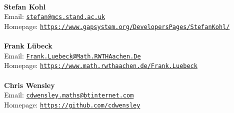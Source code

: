 \documentclass[a4paper,11pt]{report}
\begin{document}
\begin{titlepage}
{\mbox{}\\
\small \noindent \textbf{ Stefan Kohl\\
   }  Email: \href{mailto://stefan@mcs.st-and.ac.uk} {\texttt{stefan@mcs.st\texttt{}and.ac.uk}}\\
  Homepage: \href{https://www.gap-system.org/DevelopersPages/StefanKohl/} {\texttt{https://www.gap\texttt{}system.org/DevelopersPages/StefanKohl/}}}\\
{\mbox{}\\
\small \noindent \textbf{ Frank L{\"u}beck\\
   }  Email: \href{mailto://Frank.Luebeck@Math.RWTH-Aachen.De} {\texttt{Frank.Luebeck@Math.RWTH\texttt{}Aachen.De}}\\
  Homepage: \href{https://www.math.rwth-aachen.de/~Frank.Luebeck} {\texttt{https://www.math.rwth\texttt{}aachen.de/\texttt{}Frank.Luebeck}}}\\
{\mbox{}\\
\small \noindent \textbf{ Chris Wensley\\
   }  Email: \href{mailto://cdwensley.maths@btinternet.com} {\texttt{cdwensley.maths@btinternet.com}}\\
  Homepage: \href{https://github.com/cdwensley} {\texttt{https://github.com/cdwensley}}}\\
\end{titlepage}
\end{document}
